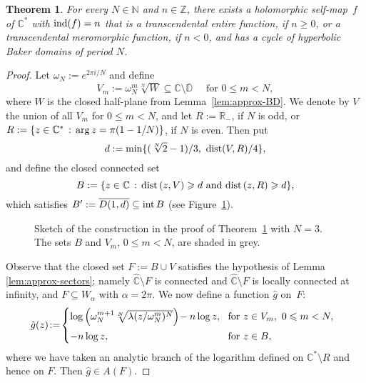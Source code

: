 \documentclass[a4paper, 12pt, reqno]{amsart}
\numberwithin{equation}{section}
\theoremstyle{plain}
\newtheorem{thm}{Theorem}[section]
\theoremstyle{definition}
\theoremstyle{remark}
\newcommand{\C}{{\mathbb{C}}}
\newcommand{\CR}{{\hat{\mathbb{C}}}}
\newcommand{\R}{{\mathbb{R}}}
\newcommand{\Z}{{\mathbb{Z}}}
\newcommand{\N}{{\mathbb{N}}}
\begin{document}
\begin{thm}
\label{thm:baker-domains-entire}
For every $N\in\N$ and $n\in\Z$, there exists a holomorphic self-map~$f$ of $\C^*$ with $\textup{ind}(f)=n$ that is a transcendental entire function, if $n\geqslant 0$, or a transcendental meromorphic function, if $n<0$, and has a cycle of hyperbolic Baker domains of period $N$.
\end{thm}
\begin{proof}
Let $\omega_{N}:=e^{2\pi i/N}$ and define 
$$
V_{m}:=\omega_{N}^m\sqrt[N]{W}\subseteq \C\setminus \overline{\mathbb D} \quad \mbox{ for } 0\leqslant m<N,
$$
where $W$ is the closed half-plane from Lemma~\ref{lem:approx-BD}. We denote by $V$ the union of all $V_m$ for $0\leqslant m<N$, and let $R:=\R_-$, if $N$ is odd, or $R:=\{z\in\C^*\,:\,\textup{arg}\,z=\pi(1-1/N)\}$, if $N$ is even. Then put 
\begin{equation}
d:=\min\{(\sqrt[N]{2}-1)/3,\ \textup{dist}(V,R)/4\},
\label{eq:bd-1}
\end{equation}
and define the closed connected set
\begin{equation}
B:=\{z\in\C\,:\,\textup{dist}\,(z,V)\geqslant d \mbox{ and } \textup{dist}\,(z,R)\geqslant d\},
\label{eq:bd-2}
\end{equation}
which satisfies $B':=\overline{D(1,d)}\subseteq \textup{int}\,B$ (see Figure~\ref{fig:sketch-bd-entire}).

\begin{figure}[h!]
\centering
\def\svgwidth{.60\linewidth}

\caption[Sketch of the construction of a transcendental entire or meromorphic function that is a self-map of $\C^*$ and has a cycle of hyperbolic Baker domains]{Sketch of the construction in the proof of Theorem~\ref{thm:baker-domains-entire} with \mbox{$N\! =\! 3$}. The sets $B$ and $V_m$, $0\leqslant m<N$, are shaded in grey.}
\label{fig:sketch-bd-entire} 
\end{figure}

Observe that the closed set $F:=B\cup V$ satisfies the hypothesis of Lemma \ref{lem:approx-sectors}; namely $\CR\setminus F$ is connected and $\CR \setminus F$ is locally connected at infinity, and $F\subseteq W_\alpha$ with $\alpha=2\pi$. We now define a function $\hat{g}$ on~$F$:
\begin{equation}
\hat{g}(z)\!:=\!\left\{\begin{array}{ll}
\!\!\!\log \left(\omega_{N}^{m+1}\sqrt[N]{\lambda (z/\omega_{N}^m)^{N}}\right)\! -n\log z, & \!\mbox{for } z\in V_m,\ 0\leqslant m<N,\vspace{5pt}\\
\!\!\!-n\log z, & \!\mbox{for } z\in B,
\end{array}\right. 
\label{eq:bd-3}
\end{equation}
where we have taken an analytic branch of the logarithm defined on $\C^*\setminus R$ and hence on $F$. Then $\hat{g}\in A(F)$.


\end{proof}
\end{document}
